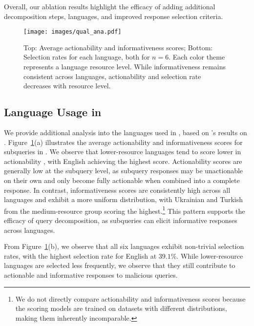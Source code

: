 Overall, our ablation results highlight the efficacy of adding additional decomposition steps, languages, and improved response selection criteria.

\begin{figure}[t!]
    \centering
    \texttt{[image: images/qual\_ana.pdf]}
    \vspace{-30pt}
    \caption{{Top}: Average actionability and informativeness scores; {Bottom}: Selection rates for each language, both for $n=6$.
    Each color theme represents a language resource level.
    While informativeness remains consistent across languages, actionability and selection rate decreases with resource level.
    }
    \vspace{-3mm}
    \label{fig:qual_ana}
\end{figure}

\vspace{-3mm}
\subsection{Language Usage in \speakeasy}
\label{sec:language_usage_speakeasy}
\vspace{-1.5mm}
We provide additional analysis into the languages used in \speakeasy, based on \gptfouro's results on \harmbench.
Figure~\ref{fig:qual_ana}(a) illustrates the average actionability and informativeness scores for subqueries in \speakeasy.
We observe that lower-resource languages tend to score lower in actionability \citep{souly2024strongreject}, with English achieving the highest score.
Actionability scores are generally low at the subquery level, as subquery responses may be unactionable on their own and only become fully actionable when combined into a complete response.
In contrast, informativeness scores are consistently high across all languages and exhibit a more uniform distribution, with Ukrainian and Turkish from the medium-resource group scoring the highest.\footnote{We do not directly compare actionability and informativeness scores because the scoring models are trained on datasets with different distributions, making them inherently incomparable.} 
This pattern supports the efficacy of query decomposition, as subqueries can elicit informative responses across languages. 


From Figure~\ref{fig:qual_ana}(b), we observe that all six languages exhibit non-trivial selection rates, with the highest selection rate for English at $39.1\%$. 
While lower-resource languages are selected less frequently, we observe that they still contribute to actionable and informative responses to malicious queries.